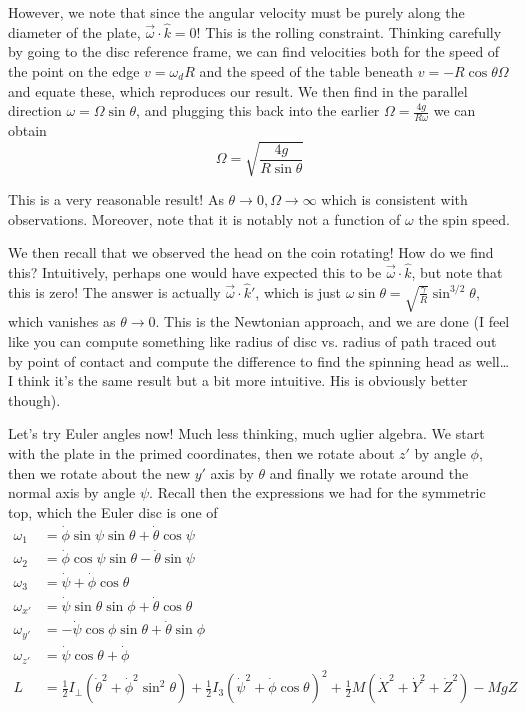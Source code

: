 \documentclass[10pt]{report}
\begin{document}
However, we note that since the angular velocity must be purely along the diameter of the plate, $\vec{\omega}\cdot \hat{k} = 0$! This is the rolling constraint. Thinking carefully by going to the disc reference frame, we can find velocities both for the speed of the point on the edge $v = \omega_d R$ and the speed of the table beneath $v = -R\cos \theta \Omega$ and equate these, which reproduces our result. We then find in the parallel direction $\omega = \Omega \sin \theta$, and plugging this back into the earlier $\Omega = \frac{4g}{R\omega}$ we can obtain
$$\Omega = \sqrt{\frac{4g}{R\sin \theta}}$$

This is a very reasonable result! As $\theta \to 0, \Omega \to \infty$ which is consistent with observations. Moreover, note that it is notably not a function of $\omega$ the spin speed.

We then recall that we observed the head on the coin rotating! How do we find this? Intuitively, perhaps one would have expected this to be $\vec{\omega}\cdot \hat{k}$, but note that this is zero! The answer is actually $\vec{\omega}\cdot \hat{k}'$, which is just $\omega\sin \theta = \sqrt{\frac{\gamma}{R}}\sin^{3/2}\theta$, which vanishes as $\theta \to 0$. This is the Newtonian approach, and we are done (I feel like you can compute something like radius of disc vs. radius of path traced out by point of contact and compute the difference to find the spinning head as well\dots I think it's the same result but a bit more intuitive. His is obviously better though).

Let's try Euler angles now! Much less thinking, much uglier algebra. We start with the plate in the primed coordinates, then we rotate about $z'$ by angle $\phi$, then we rotate about the new $y'$ axis by $\theta$ and finally we rotate around the normal axis by angle $\psi$. Recall then the expressions we had for the symmetric top, which the Euler disc is one of
\begin{align*}
    \omega_1 &= \dot{\phi}\sin \psi\sin\theta + \dot{\theta}\cos\psi\\
    \omega_2 &= \dot{\phi}\cos\psi\sin\theta - \dot{\theta}\sin\psi\\
    \omega_3 &= \dot{\psi} + \dot{\phi}\cos \theta\\
    \omega_{x'} &= \dot{\psi}\sin\theta\sin\phi + \dot{\theta}\cos\theta\\
    \omega_{y'} &= -\dot{\psi}\cos\phi\sin\theta + \dot{\theta}\sin\phi\\
    \omega_{z'} &= \dot{\psi}\cos \theta + \dot{\phi}\\
    L &= \frac{1}{2}I_{\perp} \left( \dot{\theta}^2 + \dot{\phi}^2 \sin^2\theta \right) + \frac{1}{2}I_3 \left( \dot{\psi}^2 + \dot{\phi}\cos\theta \right)^2 + \frac{1}{2}M(\dot{X}^2 + \dot{Y}^2 + \dot{Z}^2)- MgZ
\end{align*}
\end{document}
